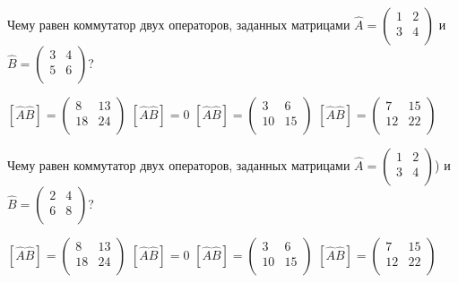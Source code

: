 \documentclass[11pt,a4paper]{exam}
\begin{document}
\begin{questions}
\question Чему равен коммутатор двух операторов, заданных матрицами $\hat{A}=\left( \begin{matrix}
   1 & 2  \\
   3 & 4  \\
\end{matrix} \right)$ и $\hat{B}=\left( \begin{matrix}
   3 & 4  \\
   5 & 6  \\
\end{matrix} \right)$?
\begin{choices}
\choice $\left[ \hat{A}\hat{B} \right]=\left( \begin{matrix}
   8 & 13  \\
   18 & 24  \\
\end{matrix} \right)$      
\choice $\left[ \hat{A}\hat{B} \right]=0$    
\choice $\left[ \hat{A}\hat{B} \right]=\left( \begin{matrix}
   3 & 6  \\
   10 & 15  \\
\end{matrix} \right)$      
\choice $\left[ \hat{A}\hat{B} \right]=\left( \begin{matrix}
   7 & 15  \\
   12 & 22  \\
\end{matrix} \right)$
\end{choices}

\question Чему равен коммутатор двух операторов, заданных матрицами $\hat{A}=\left( \begin{matrix}
   1 & 2  \\
   3 & 4  \\
\end{matrix} \right)$) и $\hat{B}=\left( \begin{matrix}
   2 & 4  \\
   6 & 8  \\
\end{matrix} \right)$?
\begin{choices}
\choice $\left[ \hat{A}\hat{B} \right]=\left( \begin{matrix}
   8 & 13  \\
   18 & 24  \\
\end{matrix} \right)$      
\choice $\left[ \hat{A}\hat{B} \right]=0$    
\choice $\left[ \hat{A}\hat{B} \right]=\left( \begin{matrix}
   3 & 6  \\
   10 & 15  \\
\end{matrix} \right)$      
\choice $\left[ \hat{A}\hat{B} \right]=\left( \begin{matrix}
   7 & 15  \\
   12 & 22  \\
\end{matrix} \right)$
\end{choices}


\end{questions}
\end{document}
